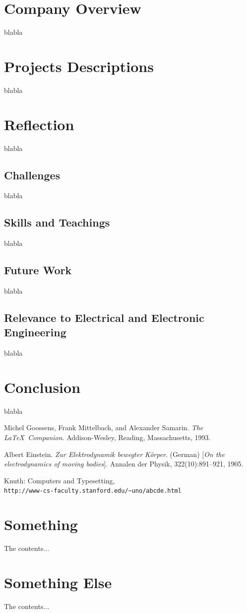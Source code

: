 \documentclass[12pt]{article}
\begin{document}
\newpage
\tableofcontents
\newpage

\section{Company Overview}
blabla

\newpage
\section{Projects Descriptions}
blabla

\newpage
\section{Reflection}
blabla

\subsection{Challenges}
blabla

\subsection{Skills and Teachings}
blabla

\subsection{Future Work}
blabla

\subsection{Relevance to Electrical and Electronic Engineering}
blabla

\newpage
\section{Conclusion}
blabla

\newpage
{}
\begin{thebibliography}{9}
Michel Goossens, Frank Mittelbach, and Alexander Samarin. 
\textit{The \LaTeX\ Companion}. 
Addison-Wesley, Reading, Massachusetts, 1993.
 
Albert Einstein. 
\textit{Zur Elektrodynamik bewegter K{\"o}rper}. (German) 
[\textit{On the electrodynamics of moving bodies}]. 
Annalen der Physik, 322(10):891–921, 1905.
 
Knuth: Computers and Typesetting,
\\\texttt{http://www-cs-faculty.stanford.edu/\~{}uno/abcde.html}
\end{thebibliography}
\newpage

\begin{appendices}
\section{Something}
The contents...

\newpage
\section{Something Else}
The contents...
\end{appendices}
\end{document}
